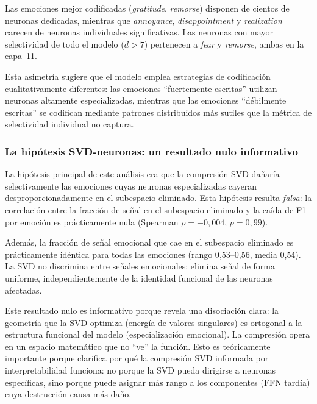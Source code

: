 Las emociones mejor codificadas (\emph{gratitude}, \emph{remorse})
disponen de cientos de neuronas dedicadas, mientras que
\emph{annoyance}, \emph{disappointment} y \emph{realization} carecen
de neuronas individuales significativas. Las neuronas con mayor
selectividad de todo el modelo ($d > 7$) pertenecen a \emph{fear} y
\emph{remorse}, ambas en la capa~11.

Esta asimetría sugiere que el modelo emplea estrategias de
codificación cualitativamente diferentes: las emociones ``fuertemente
escritas'' utilizan neuronas altamente especializadas, mientras que
las emociones ``débilmente escritas'' se codifican mediante patrones
distribuidos más sutiles que la métrica de selectividad individual no
captura.

\subsubsection{La hipótesis SVD-neuronas: un resultado nulo informativo}

La hipótesis principal de este análisis era que la compresión SVD
dañaría selectivamente las emociones cuyas neuronas especializadas
cayeran desproporcionadamente en el subespacio eliminado. Esta
hipótesis resulta \emph{falsa}: la correlación entre la fracción de
señal en el subespacio eliminado y la caída de F1 por emoción es
prácticamente nula (Spearman $\rho = -0{,}004$, $p = 0{,}99$).

Además, la fracción de señal emocional que cae en el subespacio
eliminado es prácticamente idéntica para todas las emociones (rango
0{,}53--0{,}56, media 0{,}54). La SVD no discrimina entre señales
emocionales: elimina señal de forma uniforme, independientemente de
la identidad funcional de las neuronas afectadas.

Este resultado nulo es informativo porque revela una disociación clara: la geometría que la SVD optimiza (energía de valores
singulares) es ortogonal a la estructura funcional del modelo
(especialización emocional). La compresión opera en un espacio
matemático que no ``ve'' la función. Esto es teóricamente importante
porque clarifica por qué la compresión SVD informada por
interpretabilidad funciona: no porque la SVD pueda dirigirse a
neuronas específicas, sino porque puede asignar más rango a los
componentes (FFN tardía) cuya destrucción causa más daño.

